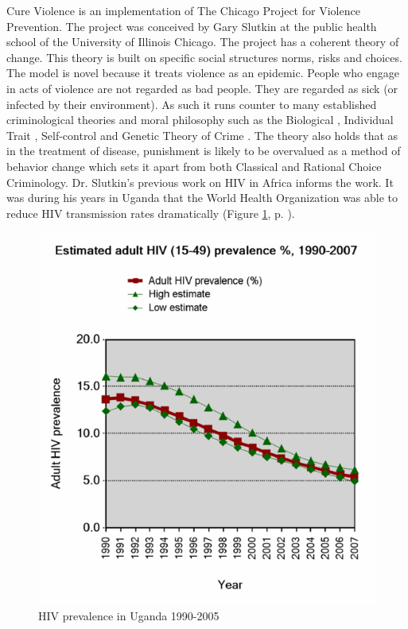 \documentclass[11pt]{article}
\begin{document}
Cure Violence is an implementation of The Chicago Project for Violence
Prevention.  The project was conceived by Gary Slutkin
\parencite{ransford201321,slutkin2012violence} at the public health
school of the University of Illinois Chicago.  The project has a
coherent theory of change.  This theory is built on specific social
structures norms, risks and choices.  The model is novel because it
treats violence as an epidemic.  People who engage in acts of violence
are not regarded as bad people.  They are regarded as sick (or
infected by their environment).  As such it runs counter to many
established criminological theories and moral philosophy such as the
Biological
\parencite{Gibson2002,Lambroso1890,Lambroso1890a,Gould1996},
Individual Trait \parencite{glueck1950unraveling,glueck1956physique},
Self-control \parencite{Gott1990,Akers1991} and Genetic Theory of
Crime
\parencite{moffitt1993adolescence,moffitt2005new,barkan1992retreat}.
The theory also holds that as in the treatment of disease, punishment
is likely to be overvalued as a method of behavior change which sets
it apart from both Classical
\parencite{beccaria2009crimes,devine1981cesare} and Rational Choice
\parencite{becker1974crime,levitt2004understanding} Criminology.
Dr. Slutkin's previous work on HIV in Africa informs the work.  It was
during his years in Uganda that the World Health Organization was able
to reduce HIV transmission rates dramatically (Figure \ref{fig:hivdrop},
p. \pageref{fig:hivdrop}).

\begin{figure}[htb]
\centering
\includegraphics[width=.9\linewidth]{./assets/543px-Estimated_adult_(15-49)_HIV_prevalence,_Uganda,_1990-2007.png}
\caption{\label{fig:hivdrop}HIV prevalence in Uganda 1990-2005 \parencite{world2008epidemiological}}
\end{figure}
\end{document}
